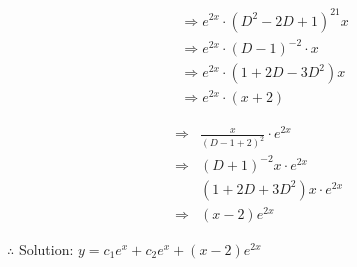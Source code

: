\documentclass[12pt, a4paper]{article}
\begin{document}
$$
\begin{aligned}
	 & \Rightarrow e^{2 x} \cdot\left(D^{2}-2 D+1\right)^{21} x \\
	 & \Rightarrow e^{2 x} \cdot(D-1)^{-2} \cdot x              \\
	 & \Rightarrow e^{2 x} \cdot\left(1+2 D-3 D^{2}\right) x    \\
	 & \Rightarrow e^{2 x} \cdot(x+2)
\end{aligned}
$$

$$
\begin{aligned}
	\Rightarrow & \frac{x}{(D-1+2)^{2}} \cdot e^{2 x}        \\
	\Rightarrow & (D+1)^{-2} x \cdot e^{2 x}                 \\
	            & \left(1+2 D+3 D^{2}\right) x \cdot e^{2 x} \\
	\Rightarrow & (x-2) e^{2 x}
\end{aligned}
$$

	$\therefore$ Solution: $y=c_{1} e^{x}+c_{2} e^{x}+(x-2) e^{2 x}$
\end{document}
